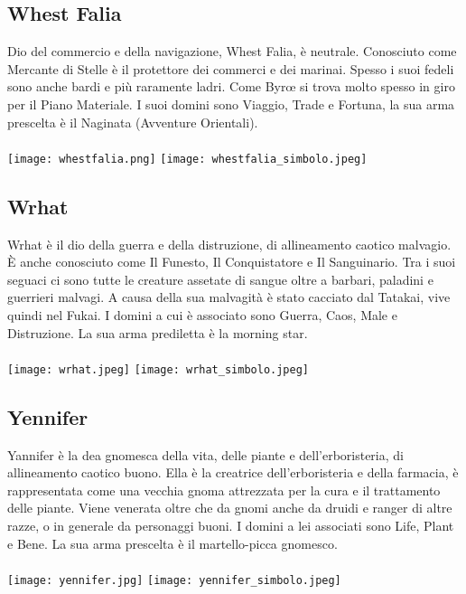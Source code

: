 \documentclass[a4paper]{report}
\begin{document}
\begin{multicols}{2}
\subsection*{Whest Falia}
Dio del commercio e della navigazione, Whest Falia, è neutrale. Conosciuto come Mercante di Stelle è il protettore dei commerci e dei marinai. Spesso i suoi fedeli sono anche bardi e più raramente ladri. Come Byrœ si trova molto spesso in giro per il Piano Materiale. I suoi domini sono Viaggio, Trade e Fortuna, la sua arma prescelta è il Naginata (Avventure Orientali).\\
\\
\texttt{[image: whestfalia.png]}
\texttt{[image: whestfalia\_simbolo.jpeg]}
\subsection*{Wrhat}
Wrhat è il dio della guerra e della distruzione, di allineamento caotico malvagio. È anche conosciuto come Il Funesto, Il Conquistatore e Il Sanguinario. Tra i suoi seguaci ci sono tutte le creature assetate di sangue oltre a barbari, paladini e guerrieri malvagi. A causa della sua malvagità è stato cacciato dal Tatakai, vive quindi nel Fukai. I domini a cui è associato sono Guerra, Caos, Male e Distruzione. La sua arma prediletta è la morning star.\\
\\
\texttt{[image: wrhat.jpeg]}
\texttt{[image: wrhat\_simbolo.jpeg]}
\subsection*{Yennifer}
Yannifer è la dea gnomesca della vita, delle piante e dell'erboristeria, di allineamento caotico buono. Ella è la creatrice dell'erboristeria e della farmacia, è rappresentata come una vecchia gnoma attrezzata per la cura e il trattamento delle piante. Viene venerata oltre che da gnomi anche da druidi e ranger di altre razze, o in generale da personaggi buoni. I domini a lei associati sono Life, Plant e Bene. La sua arma prescelta è il martello-picca gnomesco.\\
\\
\texttt{[image: yennifer.jpg]}
\texttt{[image: yennifer\_simbolo.jpeg]}
\end{multicols}
\newpage
\end{document}
